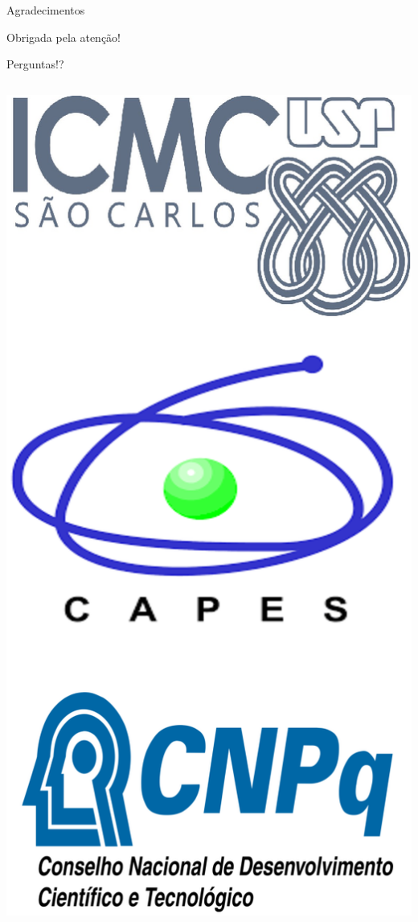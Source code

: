 \documentclass[10pt, aspectratio=169]{beamer}
\theoremstyle{remark}
\begin{document}
\begin{frame}{Agradecimentos}
\color{fg} 
\noindent
\begin{center}
	\begin{Large}
		Obrigada pela atenção!
	\end{Large}
\end{center}
\vspace{1cm}
\begin{center}
	\begin{Large}
		Perguntas!?
	\end{Large}
\end{center}
\vspace{-2.5cm}
\begin{columns} 
\vskip 1cm
   \includegraphics[scale=0.33]{AAUgraphics/agrad.eps}

\end{columns}
\end{frame}
\end{document}
